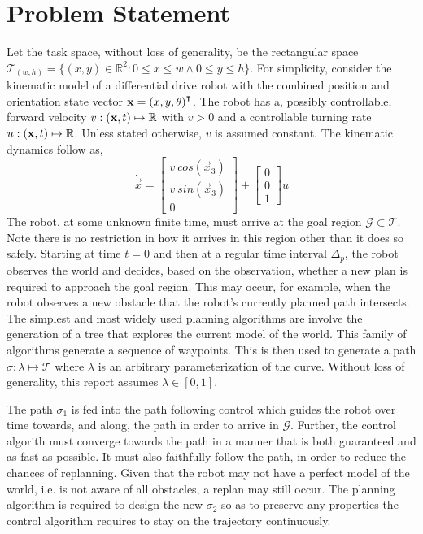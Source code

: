 \documentclass[oneside, 11pt]{book}
\begin{document}
\section{Problem Statement}
Let the task space, without loss of generality, be the rectangular space  $\mathcal{T}_{(w,h)} = \{(x,y)\in\mathbb{R}^2 : 0 \leq x \leq w \wedge 0 \leq y \leq h\}$. For simplicity, consider the kinematic model of a differential drive robot with the combined position and orientation state vector $\mathbf{x}={(x,y,\theta)}^{\intercal}$. The robot has a, possibly controllable, forward velocity $v:(\mathbf{x}, t)\mapsto\mathbb{R}$ with $v>0$ and a controllable turning rate $u:(\mathbf{x}, t)\mapsto\mathbb{R}$. Unless stated otherwise, $v$ is assumed constant. The kinematic dynamics follow as,
\begin{equation}
    \dot{\vec{x}} =
        \begin{bmatrix}
            v~cos(\vec{x}_3)\\
            v~sin(\vec{x}_3)\\
            0
        \end{bmatrix}
        +
        \begin{bmatrix} 0 \\ 0 \\ 1 \end{bmatrix}
        u
    \label{eqn:basic_kinematic_model}
\end{equation}
The robot, at some unknown finite time, must arrive at the goal region $\mathcal{G}\subset\mathcal{T}$. Note there is no restriction in how it arrives in this region other than it does so safely. Starting at time $t=0$ and then at a regular time interval $\Delta_p$, the robot observes the world and decides, based on the observation, whether a new plan is required to approach the goal region. This may occur, for example, when the robot observes a new obstacle that the robot's currently planned path intersects. The simplest and most widely used planning algorithms are involve the generation of a tree that explores the current model of the world. This family of algorithms generate a sequence of waypoints. This is then used to generate a path $\sigma: \lambda \mapsto \mathcal{T}$ where $\lambda$ is an arbitrary parameterization of the curve. Without loss of generality, this report assumes $\lambda\in[0,1]$.

The path $\sigma_1$ is fed into the path following control which guides the robot over time towards, and along, the path in order to arrive in $\mathcal{G}$. Further, the control algorith must converge towards the path in a manner that is both guaranteed and as fast as possible. It must also faithfully follow the path, in order to reduce the chances of replanning. Given that the robot may not have a perfect model of the world, i.e. is not aware of all obstacles, a replan may still occur. The planning algorithm is required to design the new $\sigma_2$ so as to preserve any properties the control algorithm requires to stay on the trajectory continuously.
\end{document}
